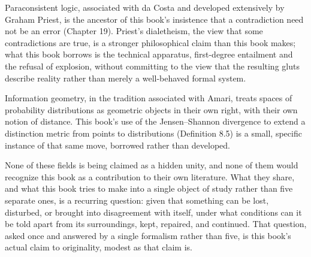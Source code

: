 \documentclass[11pt]{book}
\begin{document}
Paraconsistent logic, associated with da Costa and developed extensively by Graham Priest, is the ancestor of this book's insistence that a contradiction need not be an error (Chapter 19). Priest's dialetheism, the view that some contradictions are true, is a stronger philosophical claim than this book makes; what this book borrows is the technical apparatus, first-degree entailment and the refusal of explosion, without committing to the view that the resulting gluts describe reality rather than merely a well-behaved formal system.

Information geometry, in the tradition associated with Amari, treats spaces of probability distributions as geometric objects in their own right, with their own notion of distance. This book's use of the Jensen--Shannon divergence to extend a distinction metric from points to distributions (Definition 8.5) is a small, specific instance of that same move, borrowed rather than developed.

None of these fields is being claimed as a hidden unity, and none of them would recognize this book as a contribution to their own literature. What they share, and what this book tries to make into a single object of study rather than five separate ones, is a recurring question: given that something can be lost, disturbed, or brought into disagreement with itself, under what conditions can it be told apart from its surroundings, kept, repaired, and continued. That question, asked once and answered by a single formalism rather than five, is this book's actual claim to originality, modest as that claim is.
\end{document}
